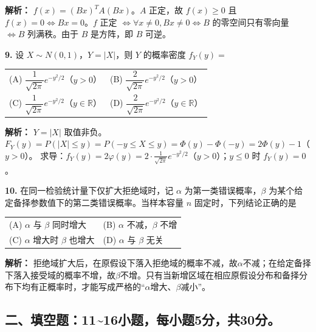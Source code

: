 \ifshowsolutions\par\noindent\textbf{解析：} $f(x)=(Bx)^T A (Bx)$。$A$ 正定，故 $f(x)\geqslant0$ 且 $f(x)=0 \iff Bx=0$。$f$ 正定 $\iff \forall x\neq0, Bx\neq0 \iff B$ 的零空间只有零向量 $\iff B$ 列满秩。由于 $B$ 是方阵，即 $B$ 可逆。\else \answerarea \fi

\vspace{8pt}

\textbf{9.} 设 $X\sim N(0,1)$，$Y=|X|$，则 $Y$ 的概率密度 $f_Y(y)=$
\begin{center}
\begin{tabular}{ll}
(A) $\dfrac{1}{\sqrt{2\pi}}e^{-y^2/2}$（$y>0$） & (B) $\dfrac{2}{\sqrt{2\pi}}e^{-y^2/2}$（$y>0$） \\[6pt]
(C) $\dfrac{1}{\sqrt{2\pi}}e^{-y^2/2}$（$y\in\mathbb{R}$） & (D) $\dfrac{2}{\sqrt{2\pi}}e^{-y^2/2}$（$y\in\mathbb{R}$）
\end{tabular}
\end{center}

\ifshowsolutions\par\noindent\textbf{解析：} $Y=|X|$ 取值非负。$F_Y(y)=P(|X|\leqslant y)=P(-y\leqslant X\leqslant y)=\Phi(y)-\Phi(-y)=2\Phi(y)-1$（$y>0$）。
求导：$f_Y(y)=2\varphi(y)=2\cdot\frac{1}{\sqrt{2\pi}}e^{-y^2/2}$（$y>0$）；$y\leqslant0$ 时 $f_Y(y)=0$。\else \answerarea \fi

\vspace{8pt}

\textbf{10.} 在同一检验统计量下仅扩大拒绝域时，记 $\alpha$ 为第一类错误概率，$\beta$ 为某个给定备择参数值下的第二类错误概率。当样本容量 $n$ 固定时，下列结论正确的是
\begin{center}
\begin{tabular}{ll}
(A) $\alpha$ 与 $\beta$ 同时增大 & (B) $\alpha$ 不减，$\beta$ 不增 \\[4pt]
(C) $\alpha$ 增大时 $\beta$ 也增大 & (D) $\alpha$ 与 $\beta$ 无关
\end{tabular}
\end{center}

\ifshowsolutions\par\noindent\textbf{解析：} 拒绝域扩大后，在原假设下落入拒绝域的概率不减，故$\alpha$不减；在给定备择下落入接受域的概率不增，故$\beta$不增。只有当新增区域在相应原假设分布和备择分布下均有正概率时，才能写成严格的“$\alpha$增大、$\beta$减小”。\else \answerarea \fi

\newpage

\subsection*{二、填空题：11\textasciitilde16小题，每小题5分，共30分。}

